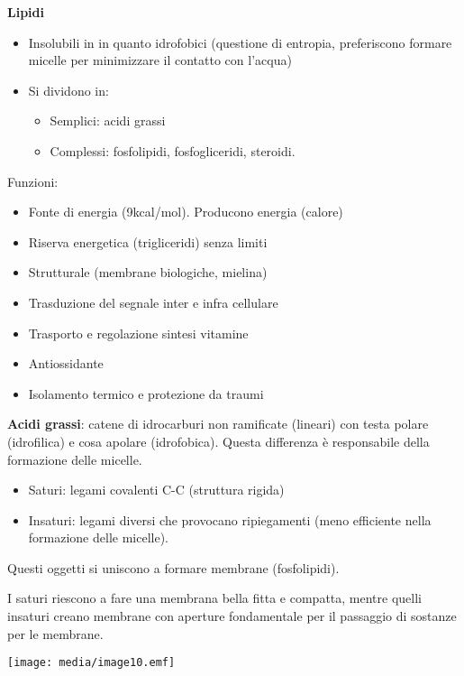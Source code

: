 \textbf{Lipidi}

\begin{itemize}
\item
  Insolubili in  in quanto idrofobici (questione di entropia,
  preferiscono formare micelle per minimizzare il contatto con l'acqua)
\item
  Si dividono in:

  \begin{itemize}
  \item
    Semplici: acidi grassi
  \item
    Complessi: fosfolipidi, fosfogliceridi, steroidi.
  \end{itemize}
\end{itemize}

Funzioni:

\begin{itemize}
\item
  Fonte di energia (9kcal/mol). Producono energia (calore)
\item
  Riserva energetica (trigliceridi) senza limiti
\item
  Strutturale (membrane biologiche, mielina)
\item
  Trasduzione del segnale inter e infra cellulare
\item
  Trasporto e regolazione sintesi vitamine
\item
  Antiossidante
\item
  Isolamento termico e protezione da traumi
\end{itemize}

\textbf{Acidi grassi}: catene di idrocarburi non ramificate (lineari)
con testa polare (idrofilica) e cosa apolare (idrofobica). Questa
differenza è responsabile della formazione delle micelle.

\begin{itemize}
\item
  Saturi: legami covalenti C-C (struttura rigida)
\item
  Insaturi: legami diversi che provocano ripiegamenti (meno efficiente
  nella formazione delle micelle).
\end{itemize}

Questi oggetti si uniscono a formare membrane (fosfolipidi).

I saturi riescono a fare una membrana bella fitta e compatta, mentre
quelli insaturi creano membrane con aperture fondamentale per il
passaggio di sostanze per le membrane.

\texttt{[image: media/image10.emf]}


